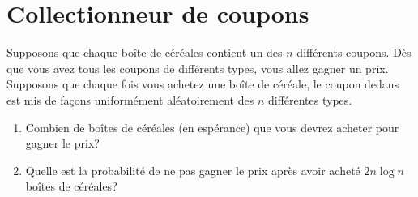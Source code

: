 \documentclass[12pt]{article}
\begin{document}
\section{Collectionneur de coupons}
Supposons que chaque boîte de céréales contient un des $n$ différents coupons. Dès que vous avez tous les coupons de différents
types, vous allez gagner un prix. Supposons que chaque fois vous achetez une boîte de céréale, le coupon dedans est mis de fa\c cons
uniformément aléatoirement des $n$ différentes types. 
\begin{enumerate}
	\item Combien de boîtes de céréales (en espérance) que vous devrez acheter pour gagner le prix?
	\item Quelle est la probabilité de ne pas gagner le prix après avoir acheté $2n \log n$ boîtes de céréales?
\end{enumerate}
\end{document}
